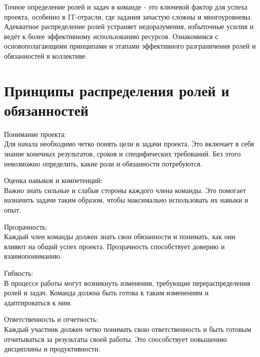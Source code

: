     Точное определение ролей и задач в команде - это ключевой фактор для успеха проекта, особенно в IT-отрасли, где задания зачастую сложны и многоуровневы. Адекватное распределение ролей устраняет недоразумения, избыточные усилия и ведёт к более эффективному использованию ресурсов. Ознакомимся с основополагающими принципами и этапами эффективного разграничения ролей и обязанностей в коллективе.

    \section{Принципы распределения ролей и обязанностей}
    Понимание проекта: \\
    Для начала необходимо четко понять цели и задачи проекта. Это включает в себя знание конечных результатов, сроков и специфических требований. Без этого невозможно определить, какие роли и обязанности потребуются.
    
    Оценка навыков и компетенций: \\
    Важно знать сильные и слабые стороны каждого члена команды. Это помогает назначить задачи таким образом, чтобы максимально использовать их навыки и опыт.
    
    Прозрачность: \\
    Каждый член команды должен знать свои обязанности и понимать, как они влияют на общий успех проекта. Прозрачность способствует доверию и взаимопониманию.
    
    Гибкость: \\
    В процессе работы могут возникнуть изменения, требующие перераспределения ролей и задач. Команда должна быть готова к таким изменениям и адаптироваться к ним.
    
    Ответственность и отчетность: \\
    Каждый участник должен четко понимать свою ответственность и быть готовым отчитываться за результаты своей работы. Это способствует повышению дисциплины и продуктивности.

